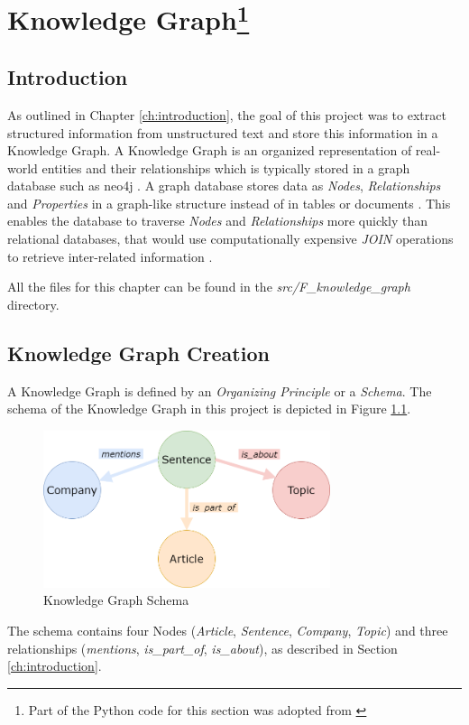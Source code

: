\chapter{Knowledge Graph\protect\footnote{Part of the Python code for this section was adopted from \cite{projdigi}}}\label{ch:knowledge_graph}
\section{Introduction}
As outlined in Chapter \ref{ch:introduction}, the goal of this project was to extract structured information from unstructured text and store this information in a Knowledge Graph.
A Knowledge Graph is an organized representation of real-world entities and their relationships which is typically stored in a graph database such as neo4j \cite{neo4j-kgdefinition}.
A graph database stores data as \emph{Nodes}, \emph{Relationships} and \emph{Properties} in a graph-like \cite{graph-definition} structure instead of in tables or documents \cite{neo4j}.
This enables the database to traverse \emph{Nodes} and \emph{Relationships} more quickly than relational databases, that would use computationally expensive \emph{JOIN} operations to retrieve inter-related information \cite{neo4j-kgdefinition}.

All the files for this chapter can be found in the \emph{src/F\_knowledge\_graph} directory.

\section{Knowledge Graph Creation}
A Knowledge Graph is defined by an \emph{Organizing Principle} \cite{neo4j-kgdefinition} or a \emph{Schema}.
The schema of the Knowledge Graph in this project is depicted in Figure \ref{fig:kg-schema-2}.
\begin{figure}[H]
	\centering
	\includegraphics[width=0.75\textwidth]{Assets/kg_schema}
	\caption{Knowledge Graph Schema}
	\label{fig:kg-schema-2}
\end{figure}
The schema contains four Nodes (\emph{Article}, \emph{Sentence}, \emph{Company}, \emph{Topic}) and
three relationships (\emph{mentions}, \emph{is\_part\_of}, \emph{is\_about}), as described in Section \ref{ch:introduction}.

